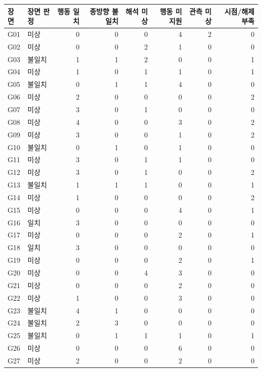 \begin{table}[t]
\centering
\color{revisionblue}
\label{tab:trajectory-cases}
\scriptsize
\begin{tabularx}{\textwidth}{lYrrrrrr}
\toprule
장면 & 장면 판정 & 행동 일치 & 종방향 불일치 & 해석 미상 & 행동 미지원 & 관측 미상 & 시점/해제 부족 \\
\midrule
G01 & 미상 & 0 & 0 & 0 & 4 & 2 & 0 \\
G02 & 미상 & 0 & 0 & 2 & 1 & 0 & 0 \\
G03 & 불일치 & 1 & 1 & 2 & 0 & 0 & 1 \\
G04 & 미상 & 1 & 0 & 1 & 1 & 0 & 1 \\
G05 & 불일치 & 0 & 1 & 1 & 4 & 0 & 0 \\
G06 & 미상 & 2 & 0 & 0 & 0 & 0 & 2 \\
G07 & 미상 & 3 & 0 & 1 & 0 & 0 & 0 \\
G08 & 미상 & 4 & 0 & 0 & 3 & 0 & 2 \\
G09 & 미상 & 3 & 0 & 0 & 1 & 0 & 2 \\
G10 & 불일치 & 0 & 1 & 0 & 1 & 0 & 0 \\
G11 & 미상 & 3 & 0 & 1 & 1 & 0 & 0 \\
G12 & 미상 & 3 & 0 & 1 & 0 & 0 & 2 \\
G13 & 불일치 & 1 & 1 & 1 & 0 & 0 & 1 \\
G14 & 미상 & 1 & 0 & 0 & 0 & 0 & 2 \\
G15 & 미상 & 0 & 0 & 0 & 4 & 0 & 1 \\
G16 & 일치 & 3 & 0 & 0 & 0 & 0 & 0 \\
G17 & 미상 & 0 & 0 & 0 & 2 & 0 & 1 \\
G18 & 일치 & 3 & 0 & 0 & 0 & 0 & 0 \\
G19 & 미상 & 0 & 0 & 0 & 2 & 0 & 1 \\
G20 & 미상 & 0 & 0 & 4 & 3 & 0 & 0 \\
G21 & 미상 & 0 & 0 & 0 & 2 & 0 & 0 \\
G22 & 미상 & 1 & 0 & 0 & 3 & 0 & 0 \\
G23 & 불일치 & 4 & 1 & 0 & 0 & 0 & 0 \\
G24 & 불일치 & 2 & 3 & 0 & 0 & 0 & 0 \\
G25 & 불일치 & 0 & 1 & 1 & 1 & 0 & 1 \\
G26 & 미상 & 0 & 0 & 0 & 6 & 0 & 0 \\
G27 & 미상 & 2 & 0 & 0 & 2 & 0 & 0 \\
\bottomrule
\end{tabularx}
\end{table}
